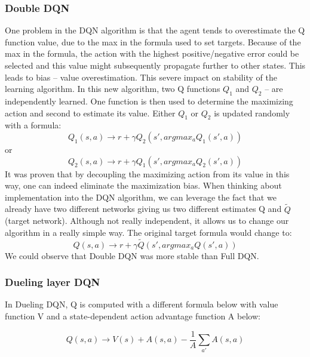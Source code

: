 \subsubsection{Double DQN}
One problem in the DQN algorithm is that the agent tends to overestimate the Q function value, due to the max in the formula used to set targets.
Because of the max in the formula, the action with the highest positive/negative error could be selected and this value might subsequently propagate further to other states. This leads to bias – value overestimation. This severe impact on stability of the learning algorithm.
\newline
In this new algorithm, two Q functions $Q_{1}$ and $Q_2$ – are independently learned. One function is then used to determine the maximizing action and second to estimate its value. Either $Q_1$ or $Q_2$ is updated randomly with a formula:
\begin{equation}
Q_1(s, a) \xrightarrow{} r + \gamma Q_2(s', argmax_a Q_1(s', a)) 
\end{equation}
or
\begin{equation}
Q_2(s, a) \xrightarrow{} r + \gamma Q_1(s', argmax_a Q_2(s', a)) 
\end{equation}
It was proven that by decoupling the maximizing action from its value in this way, one can indeed eliminate the maximization bias.
\newline
When thinking about implementation into the DQN algorithm, we can leverage the fact that we already have two different networks giving us two different estimates Q and $\tilde{Q}$ (target network). Although not really independent, it allows us to change our algorithm in a really simple way.
\newline
The original target formula would change to:
\begin{equation}
Q(s, a) \xrightarrow{} r + \gamma \tilde{Q}(s', argmax_a Q(s', a))
\end{equation}
We could observe that Double DQN was more stable than Full DQN.
 
\subsubsection{Dueling layer DQN}


In Dueling DQN, Q is computed with a different formula below with value function V and a state-dependent action advantage function A below:

\begin{equation}
Q(s,a) \rightarrow V(s) + A(s,a) -\frac{1}{A} \sum_{a'}^{} A(s,a )
\end{equation}

